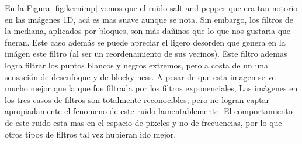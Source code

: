 En la Figura \ref{fig:kernimp}  vemos que el ruido salt and pepper que era tan notorio en
las im\'agenes 1D, ac\'a es mas suave aunque se nota. 
Sin embargo, los filtros de la mediana, aplicados por bloques, son m\'as da\~ninos que lo que
nos gustaria que fueran. Este caso adem\'as se puede apreciar el ligero desorden que genera en la 
im\'agen este filtro (al ser un reordenamiento de sus vecinos). Este filtro ademas
logra filtrar los puntos blancos y negros extremos, pero a costa de un una sensaci\'on de desenfoque
y de blocky-ness. A pesar de que esta imagen se ve mucho mejor que la que 
fue filtrada por los filtros exponenciales, 
Las im\'agenes en los tres casos de filtros son totalmente reconocibles, pero no logran captar apropiadamente
el fenomeno de este ruido lamentablemente. El comportamiento de este ruido esta mas
en el espacio de pixeles y no de frecuencias, por lo que otros tipos de filtros
tal vez hubieran ido mejor.
